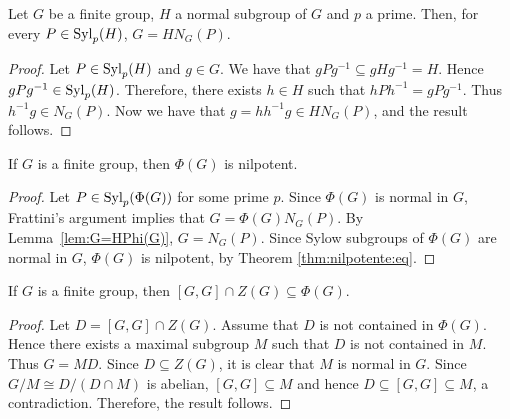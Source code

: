 \begin{lemma}
Let $G$ be a finite group, $H$ a normal subgroup of $G$ and $p$ a prime. Then, for every $P\in \mathrm{Syl}_p(H)$, $G=HN_G(P)$.
\end{lemma}

\begin{proof}
    Let $P\in\mathrm{Syl}_p(H)$ and $g\in G$. We have that $gPg^{-1}\subseteq gHg^{-1}=H$. Hence $gPg^{-1}\in\mathrm{Syl}_p(H)$.
    Therefore, there exists $h\in H$ such that $hPh^{-1}=gPg^{-1}$. Thus $h^{-1}g\in N_G(P)$. Now we have that
    $g=hh^{-1}g\in HN_G(P)$, and the result follows.
\end{proof}

\begin{theorem}[Frattini]
	\label{theorem:Frattini}
	If $G$ is a finite group, then $\Phi(G)$ is nilpotent. 
\end{theorem}

\begin{proof}
	Let $P\in\mathrm{Syl}_p(\Phi(G))$ for some prime $p$. Since $\Phi(G)$ is normal in
	$G$, Frattini's argument implies that 
	$G=\Phi(G)N_G(P)$. By Lemma~\ref{lem:G=HPhi(G)},
	$G=N_G(P)$. Since Sylow subgroups of $\Phi(G)$ are normal in $G$,
	$\Phi(G)$ is nilpotent, by Theorem \ref{thm:nilpotente:eq}.
\end{proof}



\begin{theorem}
	\label{thm:Gaschutz}
	If $G$ is a finite group, then $[G,G]\cap Z(G)\subseteq\Phi(G)$.
\end{theorem}

\begin{proof}
	Let $D=[G,G]\cap Z(G)$. Assume that $D$ is not contained in $\Phi(G)$.
	Hence there exists a maximal subgroup $M$ 
	such that $D$ is not contained in $M$. Thus $G=MD$. Since $D\subseteq Z(G)$, it is clear that $M$ is normal in $G$.
	Since $G/M\cong D/(D\cap M)$ is abelian,  $[G,G]\subseteq M$ and hence 
	$D\subseteq [G,G]\subseteq M$, a contradiction. Therefore, the result follows.
\end{proof}



